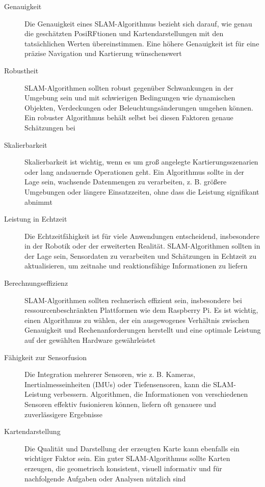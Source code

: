 \begin{description}
    \item[Genauigkeit]{Die Genauigkeit eines SLAM-Algorithmus bezieht sich darauf, wie genau die geschätzten PosiRFtionen und Kartendarstellungen mit den tatsächlichen Werten übereinstimmen. Eine höhere Genauigkeit ist für eine präzise Navigation und Kartierung wünschenswert}
    \item[Robustheit]{SLAM-Algorithmen sollten robust gegenüber Schwankungen in der Umgebung sein und mit schwierigen Bedingungen wie dynamischen Objekten, Verdeckungen oder Beleuchtungsänderungen umgehen können. Ein robuster Algorithmus behält selbst bei diesen Faktoren genaue Schätzungen bei} 
    \item[Skalierbarkeit]{Skalierbarkeit ist wichtig, wenn es um groß angelegte Kartierungsszenarien oder lang andauernde Operationen geht. Ein Algorithmus sollte in der Lage sein, wachsende Datenmengen zu verarbeiten, z. B. größere Umgebungen oder längere Einsatzzeiten, ohne dass die Leistung signifikant abnimmt}
    \item[Leistung in Echtzeit]{Die Echtzeitfähigkeit ist für viele Anwendungen entscheidend, insbesondere in der Robotik oder der erweiterten Realität. SLAM-Algorithmen sollten in der Lage sein, Sensordaten zu verarbeiten und Schätzungen in Echtzeit zu aktualisieren, um zeitnahe und reaktionsfähige Informationen zu liefern}
    \item[Berechnungseffizienz]{SLAM-Algorithmen sollten rechnerisch effizient sein, insbesondere bei ressourcenbeschränkten Plattformen wie dem Raspberry Pi. Es ist wichtig, einen Algorithmus zu wählen, der ein ausgewogenes Verhältnis zwischen Genauigkeit und Rechenanforderungen herstellt und eine optimale Leistung auf der gewählten Hardware gewährleistet}
    \item[Fähigkeit zur Sensorfusion]{Die Integration mehrerer Sensoren, wie z. B. Kameras, Inertialmesseinheiten (IMUs) oder Tiefensensoren, kann die SLAM-Leistung verbessern. Algorithmen, die Informationen von verschiedenen Sensoren effektiv fusionieren können, liefern oft genauere und zuverlässigere Ergebnisse}
    \item[Kartendarstellung]{Die Qualität und Darstellung der erzeugten Karte kann ebenfalls ein wichtiger Faktor sein. Ein guter SLAM-Algorithmus sollte Karten erzeugen, die geometrisch konsistent, visuell informativ und für nachfolgende Aufgaben oder Analysen nützlich sind} 
\end{description}

